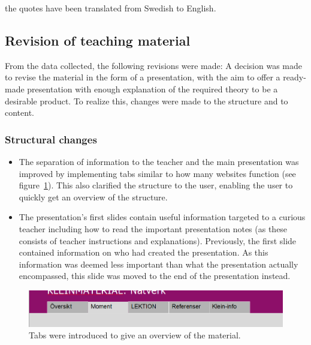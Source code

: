  the quotes have been translated from Swedish to English.
\newpage
\subsection{Revision of teaching material}
From the data collected, the following revisions were made:
A decision was made to revise the material in the form of a presentation, with the aim to offer a ready-made presentation with enough explanation of the required theory to be a desirable product. To realize this, changes were made to the structure and to content.
\subsubsection*{Structural changes}
\begin{itemize}
    \item The separation of information to the teacher and the main presentation was improved by implementing tabs similar to how many websites function (see figure~\ref{tabs}). This also clarified the structure to the user, enabling the user to quickly get an overview of the structure.
    \item The presentation's first slides contain useful information targeted to a curious teacher including how to read the important presentation notes (as these consists of teacher instructions and explanations). Previously, the first slide contained information on who had created the presentation. As this information was deemed less important than what the presentation actually encompassed, this slide was moved to the end of the presentation instead.
\end{itemize}

\begin{figure}[H]
\centering
\includegraphics[width=\linewidth]{figure/tabs2.png}
\caption{Tabs were introduced to give an overview of the material.}
\label{tabs}
\end{figure}


